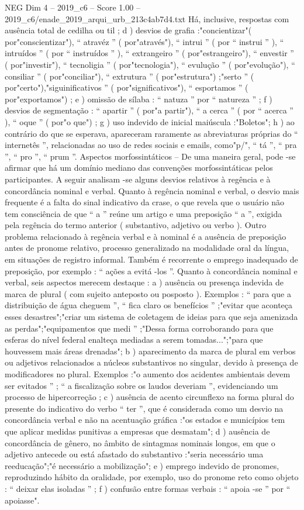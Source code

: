 \begin{textsample}{NEG Dim 4 – 2019\_c6 – Score 1.00 – 2019\_c6/enade\_2019\_arqui\_urb\_213c4ab7d4.txt}
Há, inclusive, respostas com ausência total de cedilha ou til ; d ) desvios de grafia :"concientizar"( por"conscientizar"), “ atravéz ” ( por"através"), “ intrui ” ( por “ instrui ” ), “ intruídos ” ( por “ instruídos ” ), “ extrangeiro ” ( por"estrangeiro"), “ envestir ” ( por"investir"), “ tecnoligia ” ( por"tecnologia"), “ evulução ” ( por"evolução"), “ consiliar ” ( por"conciliar"), “ extrutura ” ( por"estrutura") ;"serto ” ( por"certo"),"siguinificativos ” ( por"significativos"), “ esportamos ” ( por"exportamos") ; e ) omissão de sílaba : “ natuza ” por “ natureza ” ; f ) desvios de segmentação : “ apartir ” ( por"a partir"), “ a cerca ” ( por “ acerca ” ), “ oque ” ( por"o que") ; g ) uso indevido de inicial maiúscula :"Boletos"; h ) ao contrário do que se esperava, apareceram raramente as abreviaturas próprias do “ internetês ”, relacionadas ao uso de redes sociais e emails, como"p/", “ tá ”, “ pra ”, “ pro ”, “ prum ”.
Aspectos morfossintáticos – De uma maneira geral, pode -se afirmar que há um domínio mediano das convenções morfossintáticas pelos participantes.
A seguir analisam -se alguns desvios relativos à regência e à concordância nominal e verbal.
Quanto à regência nominal e verbal, o desvio mais frequente é a falta do sinal indicativo da crase, o que revela que o usuário não tem consciência de que “ a ” reúne um artigo e uma preposição “ a ”, exigida pela regência do termo anterior ( substantivo, adjetivo ou verbo ).
Outro problema relacionado à regência verbal e à nominal é a ausência de preposição antes de pronome relativo, processo generalizado na modalidade oral da língua, em situações de registro informal.
Também é recorrente o emprego inadequado de preposição, por exemplo : “ ações a evitá -los ”.
Quanto à concordância nominal e verbal, seis aspectos merecem destaque : a ) ausência ou presença indevida de marca de plural ( com sujeito anteposto ou posposto ).
Exemplos : “ para que a distribuição de água cheguem ”, “ fica claro os benefícios ” ;"evitar que aconteça esses desastres";"criar um sistema de coletagem de ideias para que seja amenizada as perdas";"equipamentos que medi ” ;"Dessa forma corroborando para que esferas do nível federal enalteça mediadas a serem tomadas...";"para que houvessem mais áreas drenadas"; b ) aparecimento da marca de plural em verbos ou adjetivos relacionados a núcleos substantivos no singular, devido à presença de modificadores no plural.
Exemplos :"o aumento dos acidentes ambientais devem ser evitados ” ; “ a fiscalização sobre os laudos deveriam ”, evidenciando um processo de hipercorreção ; c ) ausência de acento circunflexo na forma plural do presente do indicativo do verbo “ ter ”, que é considerada como um desvio na concordância verbal e não na acentuação gráfica :"os estados e municípios tem que aplicar medidas punitivas a empresas que desmatam"; d ) ausência de concordância de gênero, no âmbito de sintagmas nominais longos, em que o adjetivo antecede ou está afastado do substantivo :"seria necessário uma reeducação";"é necessário a mobilização"; e ) emprego indevido de pronomes, reproduzindo hábito da oralidade, por exemplo, uso do pronome reto como objeto : “ deixar elas isoladas ” ; f ) confusão entre formas verbais : “ apoia -se ” por “ apoiasse".

\end{textsample}
